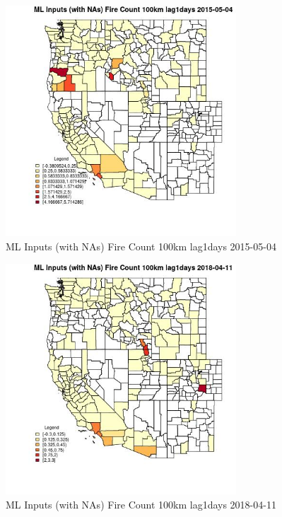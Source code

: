 \begin{figure} 
\centering  
\includegraphics[width=0.77\textwidth]{Code_Outputs/Report_ML_input_PM25_Step4_part_e_de_duplicated_aves_compiled_2019-05-18wNAs_CountyFire_Count_100km_lag1daysMean2015-05-04.jpg} 
\caption{\label{fig:Report_ML_input_PM25_Step4_part_e_de_duplicated_aves_compiled_2019-05-18wNAsCountyFire_Count_100km_lag1daysMean2015-05-04}ML Inputs (with NAs) Fire Count 100km lag1days 2015-05-04} 
\end{figure} 
 

\clearpage 

\begin{figure} 
\centering  
\includegraphics[width=0.77\textwidth]{Code_Outputs/Report_ML_input_PM25_Step4_part_e_de_duplicated_aves_compiled_2019-05-18wNAs_CountyFire_Count_100km_lag1daysMean2018-04-11.jpg} 
\caption{\label{fig:Report_ML_input_PM25_Step4_part_e_de_duplicated_aves_compiled_2019-05-18wNAsCountyFire_Count_100km_lag1daysMean2018-04-11}ML Inputs (with NAs) Fire Count 100km lag1days 2018-04-11} 
\end{figure} 
 

